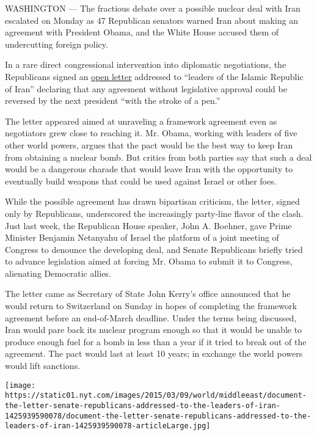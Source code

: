 WASHINGTON --- The fractious debate over a possible nuclear deal with
Iran escalated on Monday as 47 Republican senators warned Iran about
making an agreement with President Obama, and the White House accused
them of undercutting foreign policy.

In a rare direct congressional intervention into diplomatic
negotiations, the Republicans signed an
\href{http://www.nytimes.com/interactive/2015/03/09/world/middleeast/document-the-letter-senate-republicans-addressed-to-the-leaders-of-iran.html?_r=1}{open
letter} addressed to ``leaders of the Islamic Republic of Iran''
declaring that any agreement without legislative approval could be
reversed by the next president ``with the stroke of a pen.''

The letter appeared aimed at unraveling a framework agreement even as
negotiators grew close to reaching it. Mr. Obama, working with leaders
of five other world powers, argues that the pact would be the best way
to keep Iran from obtaining a nuclear bomb. But critics from both
parties say that such a deal would be a dangerous charade that would
leave Iran with the opportunity to eventually build weapons that could
be used against Israel or other foes.

While the possible agreement has drawn bipartisan criticism, the letter,
signed only by Republicans, underscored the increasingly party-line
flavor of the clash. Just last week, the Republican House speaker, John
A. Boehner, gave Prime Minister Benjamin Netanyahu of Israel the
platform of a joint meeting of Congress to denounce the developing deal,
and Senate Republicans briefly tried to advance legislation aimed at
forcing Mr. Obama to submit it to Congress, alienating Democratic
allies.

The letter came as Secretary of State John Kerry's office announced that
he would return to Switzerland on Sunday in hopes of completing the
framework agreement before an end-of-March deadline. Under the terms
being discussed, Iran would pare back its nuclear program enough so that
it would be unable to produce enough fuel for a bomb in less than a year
if it tried to break out of the agreement. The pact would last at least
10 years; in exchange the world powers would lift sanctions.

\href{https://www.nytimes.com/interactive/2015/03/09/world/middleeast/document-the-letter-senate-republicans-addressed-to-the-leaders-of-iran.html}{}

\texttt{[image: https://static01.nyt.com/images/2015/03/09/world/middleeast/document-the-letter-senate-republicans-addressed-to-the-leaders-of-iran-1425939590078/document-the-letter-senate-republicans-addressed-to-the-leaders-of-iran-1425939590078-articleLarge.jpg]}


